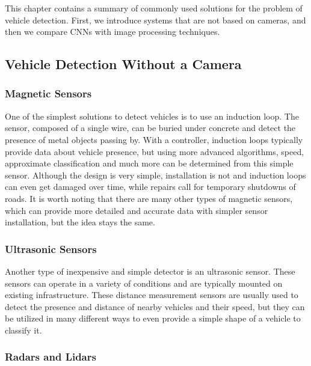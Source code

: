 This chapter contains a summary of commonly used solutions for the problem of
vehicle detection. First, we introduce systems that are not based on cameras,
and then we compare CNNs with image processing techniques. 


\subsection{Vehicle Detection Without a Camera}


\subsubsection*{Magnetic Sensors}

One of the simplest solutions to detect vehicles is to use an induction
loop.\cite{MagneticSensors} The sensor, composed of a single wire, can be buried
under concrete and detect the presence of metal objects passing by. With a
controller, induction loops typically provide data about vehicle presence, but
using more advanced algorithms, speed, approximate classification and much more
can be determined from this simple sensor. Although the design is very simple,
installation is not and induction loops can even get damaged over time, while
repairs call for temporary shutdowns of roads. It is worth noting that there
are many other types of magnetic sensors, which can provide more detailed and
accurate data with simpler sensor installation, but the idea stays the same.

\subsubsection*{Ultrasonic Sensors}

Another type of inexpensive and simple detector is an ultrasonic
sensor.\cite{UltrasonicSensors} These sensors can operate in a variety of
conditions and are typically mounted on existing infrastructure. These distance
measurement sensors are usually used to detect the presence and distance of nearby
vehicles and their speed, but they can be utilized in many different ways to
even provide a simple shape of a vehicle to classify it.

\subsubsection*{Radars and Lidars}

